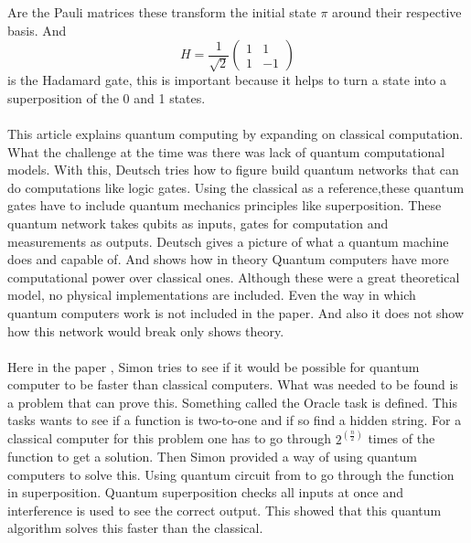 \documentclass[12pt, a4paper]{Assignment}
\begin{document}
Are the Pauli matrices these transform the initial state $\pi$ around their respective basis.
And \begin{equation}H=\frac{1}{\sqrt{2}}
	\begin{pmatrix}
		1&1\\1&-1
	\end{pmatrix}
\end{equation} is the Hadamard gate, this is important because it helps to turn a state into a superposition of the 0 and 1 states.
\\
\\
This article \cite{Deutsch1989} explains quantum computing by expanding on classical computation.
What the challenge at the time was there was lack of quantum computational models.
With this, Deutsch tries how to figure build quantum networks that can do computations like logic gates.
Using the classical as a reference,these quantum gates have to include quantum mechanics principles like superposition.
These quantum network takes qubits as inputs, gates for computation and measurements as outputs.
Deutsch gives a picture of what a quantum machine does and capable of.
And shows how in theory Quantum computers have more computational power over classical ones.
Although these were a great theoretical model, no physical implementations are included.
Even the way in which quantum computers work is not included in the paper.
And also it does not show how this network would break only shows theory.
\\\\
Here in the paper \cite{doi:10.1137/S0097539796298637}, Simon tries to see if it would be possible for quantum computer to be faster than classical computers.
What was needed to be found is a problem that can prove this.
Something called the Oracle task is defined.
This tasks wants to see if a function is two-to-one and if so find a hidden string.
For a classical computer for this problem one has to go through $ 2^{\left(\frac{n}{2}\right)}$ times of the function to get a solution. 
Then Simon provided a way of using quantum computers to solve this.
Using quantum circuit from \cite{Deutsch1989} to go through the function in superposition.
Quantum superposition checks all inputs at once and interference is used to see the correct output.
This showed that this quantum algorithm solves this faster than the classical.
\newpage 

\end{document}
